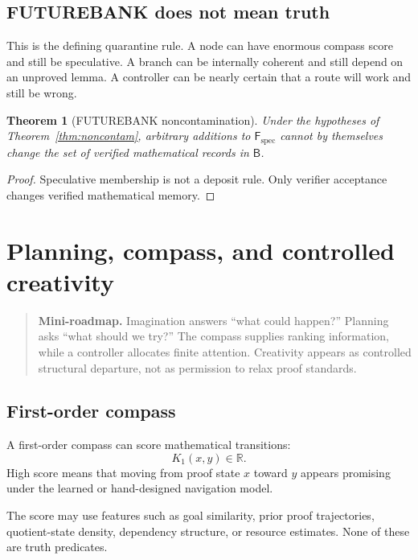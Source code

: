 \documentclass[11pt,openany]{book}
\newtheorem{theorem}{Theorem}[chapter]
\theoremstyle{definition}
\theoremstyle{remark}
\newenvironment{miniroadmap}{\begin{quote}\small\color{deepblue}\textbf{Mini-roadmap.} }{\end{quote}}
\newcommand{\Bank}{\mathsf{B}}
\newcommand{\Future}{\mathsf{F}}
\newcommand{\Spec}{\Future_{\mathrm{spec}}}
\begin{document}
\section{FUTUREBANK does not mean truth}
This is the defining quarantine rule. A node can have enormous compass score and still be speculative. A branch can be internally coherent and still depend on an unproved lemma. A controller can be nearly certain that a route will work and still be wrong.

\begin{theorem}[FUTUREBANK noncontamination]
Under the hypotheses of Theorem~\ref{thm:noncontam}, arbitrary additions to $\Spec$ cannot by themselves change the set of verified mathematical records in $\Bank$.
\end{theorem}
\begin{proof}
Speculative membership is not a deposit rule. Only verifier acceptance changes verified mathematical memory.
\end{proof}

\chapter{Planning, compass, and controlled creativity}
\begin{miniroadmap}
Imagination answers ``what could happen?'' Planning asks ``what should we try?'' The compass supplies ranking information, while a controller allocates finite attention. Creativity appears as controlled structural departure, not as permission to relax proof standards.
\end{miniroadmap}

\section{First-order compass}
A first-order compass can score mathematical transitions:
\[
K_1(x,y)\in\mathbb R.
\]
High score means that moving from proof state $x$ toward $y$ appears promising under the learned or hand-designed navigation model.

The score may use features such as goal similarity, prior proof trajectories, quotient-state density, dependency structure, or resource estimates. None of these are truth predicates.
\end{document}
